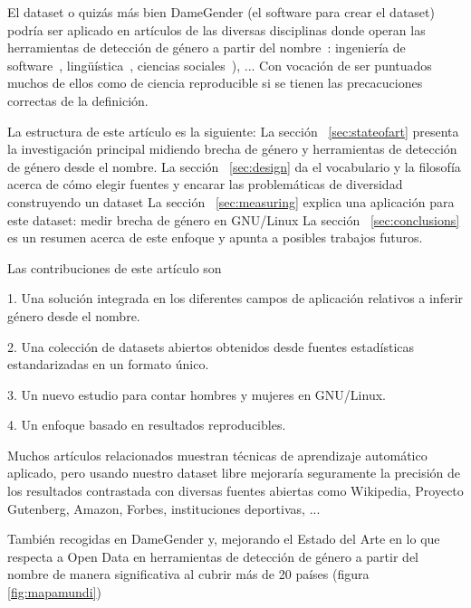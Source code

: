 \documentclass[a4paper]{article}
\begin{document}
El dataset o quizás más bien DameGender (el software para crear el dataset)
podría ser aplicado en artículos de las diversas disciplinas donde operan
las herramientas de detección de género a partir del nombre~\cite{sun2019mitigating}:
ingeniería de software~\cite{vasilescu2012gender}, lingüística~\cite{hutson2016gender,al2009socio},
ciencias sociales~\cite{holman2018gender,mislove2011understanding,niemi2017gendered,de2014genero}),
... Con vocación de ser puntuados muchos de ellos como de ciencia
reproducible\cite{peng2011reproducible} si se tienen las precacuciones
correctas de la definición.

La estructura de este artículo es la siguiente:
La sección ~\ref{sec:stateofart} presenta la investigación principal midiendo brecha de género
y herramientas de detección de género desde el nombre.
La sección ~\ref{sec:design} da el vocabulario y la filosofía acerca de cómo elegir
fuentes y encarar las problemáticas de diversidad construyendo un
dataset
La sección ~\ref{sec:measuring} explica una aplicación para este dataset: medir brecha de
género en GNU/Linux
La sección ~\ref{sec:conclusions} es un resumen acerca de este enfoque y apunta a posibles
trabajos futuros.

Las contribuciones de este artículo son

1. Una solución integrada en los diferentes campos de aplicación relativos
a inferir género desde el nombre.

2. Una colección de datasets abiertos obtenidos desde fuentes estadísticas
estandarizadas en un formato único.

3. Un nuevo estudio para contar hombres y mujeres en GNU/Linux.

4. Un enfoque basado en resultados reproducibles.

Muchos artículos relacionados muestran técnicas de aprendizaje automático
aplicado, pero usando nuestro dataset libre mejoraría seguramente la
precisión de los resultados contrastada con diversas fuentes abiertas como Wikipedia,
Proyecto Gutenberg, Amazon, Forbes, instituciones deportivas, ... 

También recogidas en DameGender y, mejorando el Estado del Arte en lo que
respecta a Open Data en herramientas de detección de género a partir del
nombre de manera significativa al cubrir más de 20 países (figura \ref{fig:mapamundi})
\end{document}
